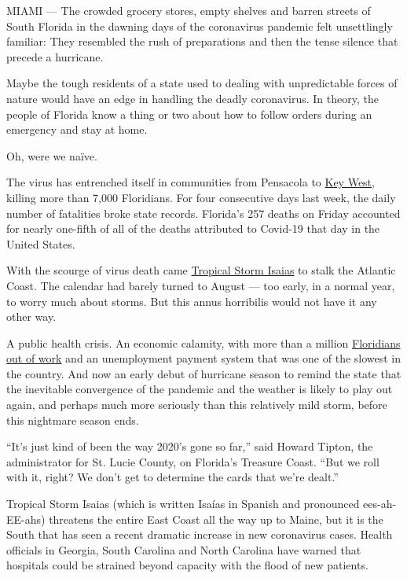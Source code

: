 MIAMI --- The crowded grocery stores, empty shelves and barren streets
of South Florida in the dawning days of the coronavirus pandemic felt
unsettlingly familiar: They resembled the rush of preparations and then
the tense silence that precede a hurricane.

Maybe the tough residents of a state used to dealing with unpredictable
forces of nature would have an edge in handling the deadly coronavirus.
In theory, the people of Florida know a thing or two about how to follow
orders during an emergency and stay at home.

Oh, were we naïve.

The virus has entrenched itself in communities from Pensacola to
\href{https://www.nytimes.com/2020/07/31/us/coronavirus-masks-enforcement-key-west.html?referringSource=articleShare}{Key
West}, killing more than 7,000 Floridians. For four consecutive days
last week, the daily number of fatalities broke state records. Florida's
257 deaths on Friday accounted for nearly one-fifth of all of the deaths
attributed to Covid-19 that day in the United States.

With the scourge of virus death came
\href{https://www.nytimes.com/2020/08/03/us/isaias-storm-updates.html}{Tropical
Storm Isaias} to stalk the Atlantic Coast. The calendar had barely
turned to August --- too early, in a normal year, to worry much about
storms. But this annus horribilis would not have it any other way.

A public health crisis. An economic calamity, with more than a million
\href{https://www.nytimes.com/2020/04/23/us/florida-coronavirus-unemployment.html}{Floridians
out of work} and an unemployment payment system that was one of the
slowest in the country. And now an early debut of hurricane season to
remind the state that the inevitable convergence of the pandemic and the
weather is likely to play out again, and perhaps much more seriously
than this relatively mild storm, before this nightmare season ends.

``It's just kind of been the way 2020's gone so far,'' said Howard
Tipton, the administrator for St. Lucie County, on Florida's Treasure
Coast. ``But we roll with it, right? We don't get to determine the cards
that we're dealt.''

Tropical Storm Isaias (which is written Isaías in Spanish and pronounced
ees-ah-EE-ahs) threatens the entire East Coast all the way up to Maine,
but it is the South that has seen a recent dramatic increase in new
coronavirus cases. Health officials in Georgia, South Carolina and North
Carolina have warned that hospitals could be strained beyond capacity
with the flood of new patients.

